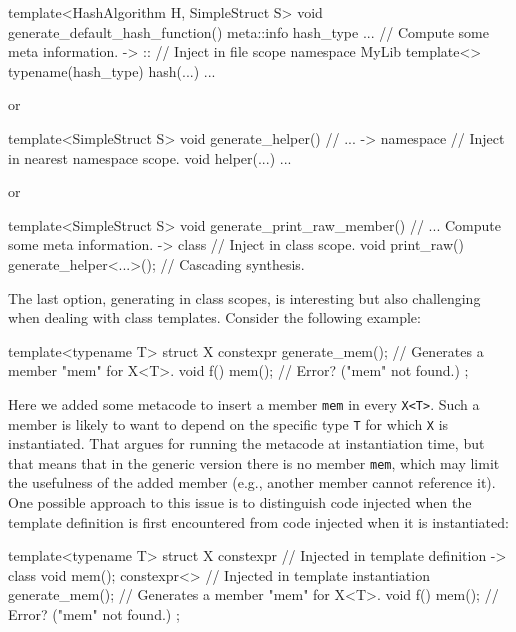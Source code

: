 \documentclass{wg21}
\newcommand{\cc}[1]{\texttt{#1}}
\begin{document}
\begin{cpp}
template<HashAlgorithm H, SimpleStruct S>
void generate_default_hash_function() {
  meta::info hash_type ...  // Compute some meta information.
  -> :: {  // Inject in file scope
    namespace MyLib {
      template<> typename(hash_type) hash(...) {
         ...
      }
    }
  }
}
\end{cpp}

or

\begin{cpp}
template<SimpleStruct S>
void generate_helper() {
  // ...
  -> namespace {  // Inject in nearest namespace scope.
    void helper(...) { ... }
  }
}
\end{cpp}

or

\begin{cpp}
template<SimpleStruct S>
void generate_print_raw_member() {
  // ... Compute some meta information.
  -> class {  // Inject in class scope.
    void print_raw() {
      generate_helper<...>();  // Cascading synthesis.
    }
  }
}
\end{cpp}

The last option, generating in class scopes, is interesting but also challenging
when dealing with class templates. Consider the following example:

\begin{cpp}
template<typename T> struct X {
  constexpr {
    generate_mem();  // Generates a member "mem" for X<T>.
  }
  void f() {
    mem();  // Error? ("mem" not found.)
  }
};
\end{cpp}

Here we added some metacode to insert a member \cc{mem} in every \cc{X<T>}.
Such a member is likely to want to depend on the specific type \cc{T} for
which \cc{X} is instantiated. That argues for running the metacode at
instantiation time, but that means that in the generic version there is
no member \cc{mem}, which may limit the usefulness of the added member
(e.g., another member cannot reference it). One possible approach to this
issue is to distinguish code injected when the template definition is first
encountered from code injected when it is instantiated:

\begin{cpp}
template<typename T> struct X {
  constexpr {  // Injected in template definition
    -> class { void mem(); }
  }
  constexpr<> {  // Injected in template instantiation
    generate_mem();  // Generates a member "mem" for X<T>.
  }
  void f() {
    mem();  // Error? ("mem" not found.)
  }
};
\end{cpp}
\end{document}
